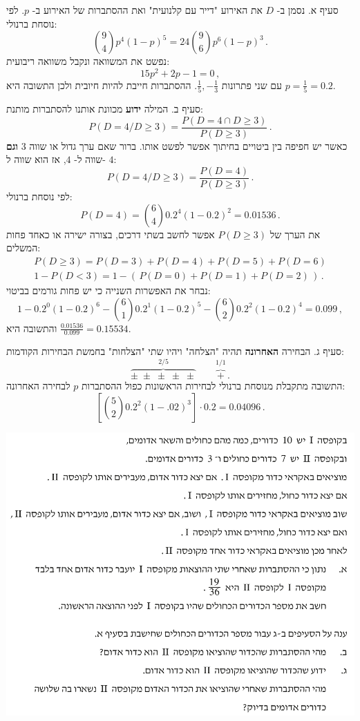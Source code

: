 \documentclass[12pt,a4paper]{article}
\begin{document}
סעיף א. נסמן ב-%
$D$
את האירוע "דייר עם קלנועית" ואת ההסתברות של האירוע ב-%
$p$.
לפי נוסחת ברנולי:
\[
{9\choose 4} p^4 (1-p)^5=24 {9\choose 6} p^6 (1-p)^3\,.
\]
נפשט את המשוואה ונקבל משוואה ריבועית:
\[
15p^2+2p-1=0\,,
\]
עם שני פתרונות
$\frac{1}{5},-\frac{1}{3}$.
ההסתברות חייבת להיות חיובית ולכן התשובה היא 
$p=\frac{1}{5}=0.2$.

סעיף ב. המילה
\textbf{ידוע}
מכוונת אותנו להסתברות מותנת:
\[
P(D=4/D\ge3) = \frac{P(D=4\cap D\ge 3)}{P(D\ge 3)}\,.
\]
כאשר יש חפיפה בין ביטויים בחיתוך אפשר לפשט אותו. ברור שאם ערך גדול או שווה
$3$
\textbf{וגם}
שווה ל-%
$4$,
אז הוא שווה ל-%
$4$:
\[
P(D=4/D\ge3) =\frac{P(D=4)}{P(D\ge 3)}\,.
\]
לפי נוסחת ברנולי:
\[
P(D=4)={6\choose 4} 0.2^4 (1-0.2)^2= 0.01536\,.
\]
את הערך של
$P(D\ge 3)$
אפשר לחשב בשתי דרכים, בצורה ישירה או כאחד פחות המשלים:
\[
\renewcommand{\arraystretch}{1.4}
\begin{array}{l}
P(D\ge 3) = P(D=3) + P(D=4) + P(D=5) + P(D=6)\\
1- P(D<3)=1-(\,P(D=0) + P(D=1) + P(D=2)\,)\,.
\end{array}
\]
נבחר את האפשרות השנייה כי יש פחות גורמים בביטוי:
\[
1-0.2^0(1-0.2)^6-{6\choose 1}0.2^1(1-0.2)^5 - {6 \choose 2} 0.2^2(1-0.2)^4=0.099\,,
\]
והתשובה היא
$\displaystyle\frac{0.01536}{0.099}=0.15534$.

סעיף ג. הבחירה 
\textbf{האחרונה} 
תהיה "הצלחה" ויהיו שתי "הצלחות" בחמשת הבחירות הקודמות:
\[
\overbrace{\pm\;\pm\;\pm\;\pm\;\pm}^{2/5}\quad\quad \overbrace{+}^{1/1}\,.
\]
התשובה מתקבלת מנוסחת ברנולי לבחירות הראשונות כפול ההסתברות
$p$
לבחירה האחרונה:
\[
\left[{5\choose 2}0.2^2 (1-.02)^3\right]\cdot 0.2=0.04096\,.
\]


\textbf{}

\begin{center}
\includegraphics[width=.95\textwidth]{summer-2017b-3}
\end{center}
\end{document}

